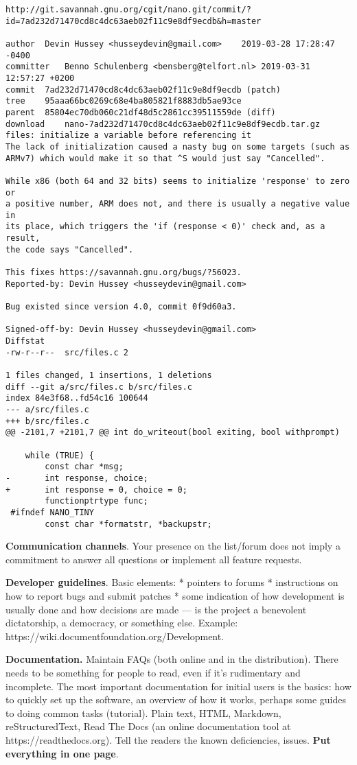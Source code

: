 \documentclass[landscape,30pt]{foils}
\begin{document}
{\tiny
\begin{verbatim}
http://git.savannah.gnu.org/cgit/nano.git/commit/?id=7ad232d71470cd8c4dc63aeb02f11c9e8df9ecdb&h=master

author	Devin Hussey <husseydevin@gmail.com>	2019-03-28 17:28:47 -0400
committer	Benno Schulenberg <bensberg@telfort.nl>	2019-03-31 12:57:27 +0200
commit	7ad232d71470cd8c4dc63aeb02f11c9e8df9ecdb (patch)
tree	95aaa66bc0269c68e4ba805821f8883db5ae93ce
parent	85804ec70db060c21df48d5c2861cc39511559de (diff)
download	nano-7ad232d71470cd8c4dc63aeb02f11c9e8df9ecdb.tar.gz
files: initialize a variable before referencing it
The lack of initialization caused a nasty bug on some targets (such as
ARMv7) which would make it so that ^S would just say "Cancelled".

While x86 (both 64 and 32 bits) seems to initialize 'response' to zero or
a positive number, ARM does not, and there is usually a negative value in
its place, which triggers the 'if (response < 0)' check and, as a result,
the code says "Cancelled".

This fixes https://savannah.gnu.org/bugs/?56023.
Reported-by: Devin Hussey <husseydevin@gmail.com>

Bug existed since version 4.0, commit 0f9d60a3.

Signed-off-by: Devin Hussey <husseydevin@gmail.com>
Diffstat
-rw-r--r--	src/files.c	2	
		
1 files changed, 1 insertions, 1 deletions
diff --git a/src/files.c b/src/files.c
index 84e3f68..fd54c16 100644
--- a/src/files.c
+++ b/src/files.c
@@ -2101,7 +2101,7 @@ int do_writeout(bool exiting, bool withprompt)
 
 	while (TRUE) {
 		const char *msg;
-		int response, choice;
+		int response = 0, choice = 0;
 		functionptrtype func;
 #ifndef NANO_TINY
 		const char *formatstr, *backupstr;
\end{verbatim}
}


{\bf Communication channels}.  Your presence on the list/forum does not imply a commitment to answer all questions or implement all feature requests.

{\bf Developer guidelines}. Basic elements: *  pointers to forums  * instructions on how to report bugs and submit patches  *  some indication of how development is usually done and how decisions are made — is the project a
benevolent dictatorship, a democracy, or something else.  Example: https://wiki.documentfoundation.org/Development.

{\bf Documentation.}  Maintain FAQs (both online and in the
distribution). There needs to be something for people to read, even if
it's rudimentary and incomplete. The most important documentation for
initial users is the basics: how to quickly set up the software, an
overview of how it works, perhaps some guides to doing common tasks
(tutorial).  Plain text, HTML, Markdown, reStructuredText, Read The
Docs (an online documentation tool at https://readthedocs.org).  Tell the readers the known
deficiencies, issues.  {\bf Put everything in one page}.
\end{document}
